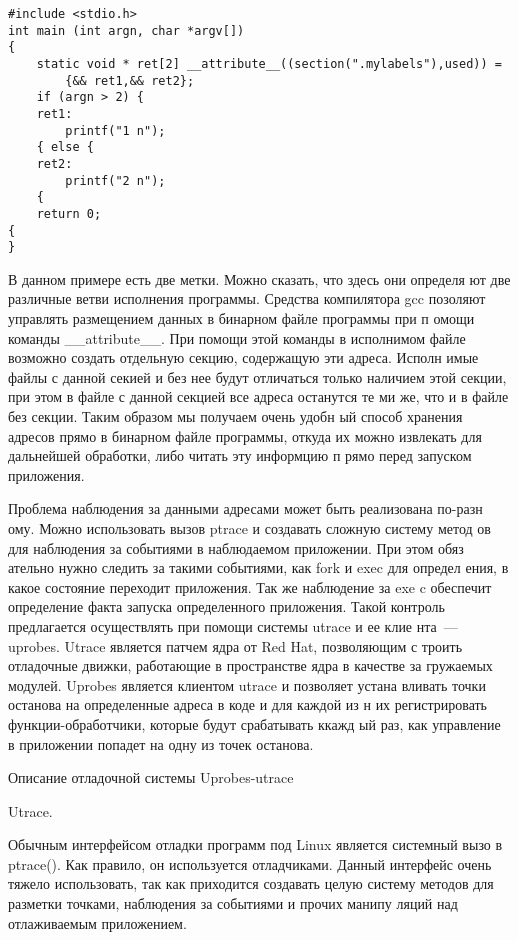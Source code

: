 \bigskip
\begin{lstlisting}
#include <stdio.h>
int main (int argn, char *argv[])
{ 
	static void * ret[2] __attribute__((section(".mylabels"),used)) = 
		{&& ret1,&& ret2};
	if (argn > 2) {
	ret1:
		printf("1 n");
	{ else {
	ret2:
		printf("2 n");
	{
	return 0;
{ 
}
\end{lstlisting}
\bigskip
В данном примере есть две метки. Можно сказать, что здесь они определя
ют две различные ветви исполнения программы. Средства компилятора gcc 
позоляют управлять размещением данных в бинарном файле программы при п
омощи команды \_\_attribute\_\_. При помощи этой команды в исполнимом 
файле возможно создать отдельную секцию, содержащую эти адреса. Исполн
имые файлы с данной секией и без нее будут отличаться только наличием 
этой секции, при этом в файле с данной секцией все адреса останутся те
ми же, что и в файле без секции. Таким образом мы получаем очень удобн
ый способ хранения адресов прямо в бинарном файле программы, откуда их
 можно извлекать для дальнейшей обработки, либо читать эту информцию п
рямо перед запуском приложения.

Проблема наблюдения за данными адресами может быть реализована по-разн
ому. Можно использовать вызов ptrace и создавать сложную систему метод
ов для наблюдения за событиями в наблюдаемом приложении. При этом обяз
ательно нужно следить за такими событиями, как fork и exec для определ
ения, в какое состояние переходит приложения. Так же наблюдение за exe
c обеспечит определение факта запуска определенного приложения. Такой 
контроль предлагается осуществлять при помощи системы utrace и ее клие
нта~--- uprobes. Utrace является патчем ядра от Red Hat, позволяющим с
троить отладочные движки, работающие в пространстве ядра в качестве за
гружаемых модулей. Uprobes является клиентом utrace и позволяет устана
вливать точки останова на определенные адреса в коде и для каждой из н
их регистрировать функции-обработчики, которые будут срабатывать ккажд
ый раз, как управление в приложении попадет на одну из точек останова.
 

\bigskip
Описание отладочной системы Uprobes-utrace

\bigskip
Utrace.

\bigskip
Обычным интерфейсом отладки программ под Linux является системный вызо
в ptrace(). Как правило, он используется отладчиками. Данный интерфейс
 очень тяжело использовать, так как приходится создавать целую систему
 методов для разметки точками, наблюдения за событиями и прочих манипу
ляций над отлаживаемым приложением. 

